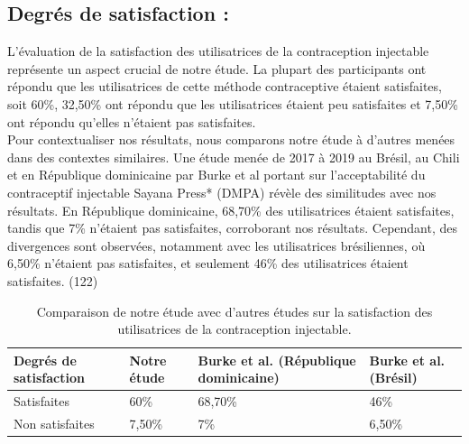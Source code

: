 \subsection{Degrés de satisfaction : }

L'évaluation de la satisfaction des utilisatrices de la contraception injectable représente un aspect crucial de notre étude. La plupart des participants ont répondu que les utilisatrices de cette méthode contraceptive étaient satisfaites, soit 60\%, 32,50\% ont répondu que les utilisatrices étaient peu satisfaites et 7,50\%  ont répondu qu’elles n’étaient pas satisfaites. \\

\noindent Pour contextualiser nos résultats, nous comparons notre étude à d'autres menées dans des contextes similaires. Une étude menée de 2017 à 2019 au Brésil, au Chili et en République dominicaine par Burke et al portant sur l’acceptabilité  du contraceptif injectable Sayana Press* (DMPA) révèle des similitudes avec nos résultats. En République dominicaine, 68,70\% des utilisatrices étaient satisfaites, tandis que 7\% n'étaient pas satisfaites, corroborant nos résultats. Cependant, des divergences sont observées, notamment avec les utilisatrices brésiliennes, où 6,50\% n'étaient pas satisfaites, et seulement 46\% des utilisatrices étaient satisfaites. (122) 

\begin{table}[H]
  \centering
  \renewcommand{\arraystretch}{1.5}

  \begin{spacing}{1.5} %
  \begin{tabularx}{\textwidth}{|p{2.7cm}|X|p{5.5cm}|p{4.4cm}|}
      \hline
      \textbf{Degrés de \newline satisfaction} & \textbf{Notre étude } & \textbf{Burke et al. (République dominicaine)} & \textbf{Burke et al. (Brésil)}\\
      \hline
      Satisfaites & 60\% & 68,70\% & 46\%\\
      \hline
      Non satisfaites  & 7,50\% & 7\% & 6,50\%\\
      
      \hline
  \end{tabularx}
\end{spacing}
\captionsetup{justification=centering} %
\caption{Comparaison de notre étude avec d’autres études sur la satisfaction des utilisatrices de la contraception injectable.}

\end{table}

